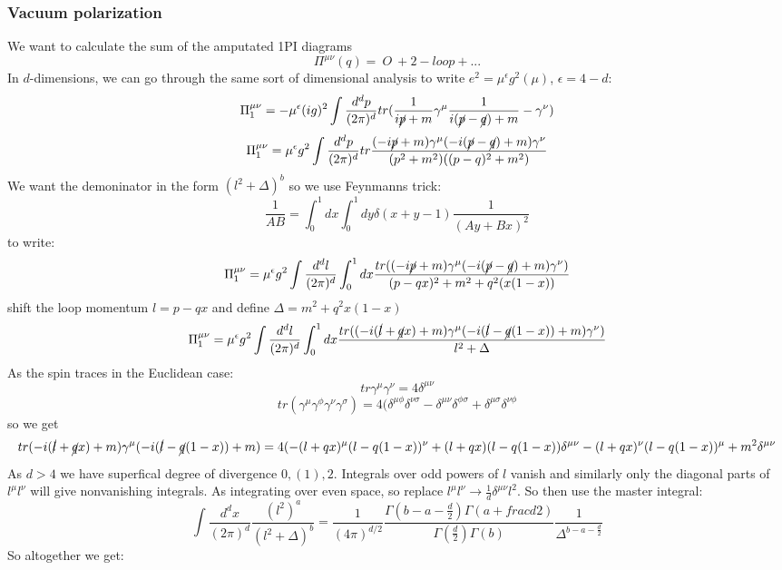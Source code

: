 \documentclass{article}
\begin{document}
        \subsubsection{Vacuum polarization}
We want to calculate the sum of the amputated 1PI diagrams
$$
\Pi^{\mu \nu} (q) = ~O~ + 2-loop + ...
$$
In $d$-dimensions, we can go through the same sort of dimensional analysis to write $e^2 = \mu^{\epsilon} g^2(\mu)$, $\epsilon = 4 -d$:
$$
 \Pi_1^{\mu \nu} = - \mu^{\epsilon} (i g)^2 \int \frac{d^dp}{(2\pi)^d} tr( \frac{1}{i \cancel p+ m} \gamma^{\mu} \frac{1}{i( \cancel p - \cancel q) +m} - \gamma^{\nu})
$$
$$
\Pi_1^{\mu \nu} = \mu^{\epsilon} g^2 \int \frac{d^d p}{(2\pi)^d} tr \frac{ (-i \cancel p + m) \gamma^{\mu} ( - i ( \cancel p - \cancel q) + m) \gamma^{\nu}}{( p^2 + m^2) ( (p-q)^2 + m^2)}
$$
 We want the demoninator in the form $(l^2 + \Delta)^b$ so we use Feynmanns trick:
 $$ 
 \frac{1}{AB} = \int^1_0 dx \int^1_0 dy \delta(x+y-1) \frac{1}{(Ay+Bx)^2}
 $$
 to write:
 $$
 \Pi_1^{\mu \nu} = \mu^{\epsilon} g^2 \int \frac{d^d l}{(2\pi)^d} \int^1_0 dx \frac{ tr ((-i \cancel p + m) \gamma^{\mu} ( - i ( \cancel p - \cancel q) + m) \gamma^{\nu})}{(p-qx)^2 + m^2 + q^2(x(1-x))}
 $$
 shift the loop momentum $l = p - qx$ and define $\Delta = m^2 + q^2x(1-x)$
 $$
 \Pi_1^{\mu \nu} = \mu^{\epsilon} g^2 \int \frac{d^d l}{(2\pi)^d} \int^1_0 dx \frac{ tr ((-i (\cancel l + \cancel qx) + m) \gamma^{\mu} ( - i ( \cancel l - \cancel q(1-x)) + m) \gamma^{\nu})}{l^2+ \Delta}
 $$
 As the spin traces in the Euclidean case:
 $$
  tr \gamma^{\mu} \gamma^{\nu} = 4 \delta^{\mu \nu}
 $$
 $$
  tr ( \gamma^{\mu} \gamma^{\phi} \gamma^{\nu} \gamma^{\sigma}) = 4 (\delta^{\mu \phi} \delta^{\nu \sigma} - \delta^{\mu \nu} \delta^{\phi \sigma}+ \delta^{\mu \sigma} \delta^{\nu \phi}
 $$
 so we get
 $$
 tr (-i (\cancel l + \cancel qx) + m) \gamma^{\mu} ( - i ( \cancel l - \cancel q(1-x)) + m) = 4 ( - (l + qx)^{\mu} ( l- q(1-x))^{\nu} + (l + qx)(l-q(1-x))\delta^{\mu \nu} - ( l + qx)^{\nu} ( l- q(1-x))^{\mu} + m^2 \delta^{\mu \nu}
 $$
 As $d >4$ we have superfical degree of divergence $0, (1), 2$. Integrals over odd powers of $l$ vanish and similarly only the diagonal parts of $l^{\mu} l^{\nu}$ will give nonvanishing integrals. As integrating over even space, so replace $l^{\mu} l^{\nu} \rightarrow \frac{1}{d} \delta^{\mu \nu} l^2$. So then use the master integral:
 $$
 \int \frac{d^d x}{(2\pi)^d} \frac{(l^2)^a}{(l^2 + \Delta)^b} = \frac{1}{(4\pi)^{d/2}} \frac{\Gamma( b-a- \frac{d}{2}) \Gamma( a + frac{d}{2})}{\Gamma(\frac{d}{2} ) \Gamma( b)} \frac{1}{\Delta ^{b-a- \frac{d}{2}}}
 $$
 So altogether we get:
\end{document}
